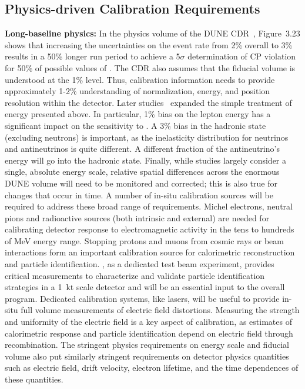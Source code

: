 \subsection{Physics-driven Calibration Requirements}
\label{sec:phys-calib-req}


\textbf{Long-baseline physics:} In the physics volume of the DUNE CDR~\cite{Acciarri:2015uup}, Figure~3.23 shows that increasing the uncertainties on the \nue event rate from \num{2}\% overall to \num{3}\% results in a \num{50}\% longer run period to achieve a 5$\sigma$ determination of CP violation for 50\% of possible values of . The CDR also assumes that the fiducial volume is understood at the 1\% level. Thus, calibration information needs to provide approximately 1-2\% understanding of normalization, energy, and position resolution within the detector. Later studies~\cite{ebias} expanded the simple treatment of energy  presented above. In particular, \num{1}\% bias on the lepton energy has a significant impact on the sensitivity to . 
A \num{3}\% bias in the hadronic state (excluding neutrons) is important, as the inelasticity  distribution for neutrinos and antineutrinos is quite different.  A different fraction of the antineutrino's energy will go into the hadronic state. Finally, while studies largely consider a single, absolute energy scale, relative spatial differences across the enormous DUNE  volume will need to be monitored and corrected; this is also true for changes that occur in time. A number of in-situ calibration sources will be required to address these broad range of requirements. Michel electrons, neutral pions and radioactive sources (both intrinsic and external) are needed for calibrating detector response to electromagnetic activity in the tens to hundreds of MeV energy range. Stopping protons and muons from cosmic rays or beam interactions form an important calibration source for calorimetric reconstruction and particle identification. , as a dedicated test beam experiment, provides critical measurements to characterize and validate particle identification strategies in a 1~kt scale detector and will be an essential input to the overall program. Dedicated calibration systems, like lasers, will be useful to provide in-situ full volume measurements of electric field distortions. Measuring the strength and uniformity of the electric field is a key aspect of calibration, as  estimates of calorimetric response and particle identification depend on electric field through recombination. The stringent physics requirements on energy scale and fiducial volume also put similarly stringent requirements on detector physics quantities such as electric field, drift velocity, electron lifetime, and the time dependences of these quantities.

